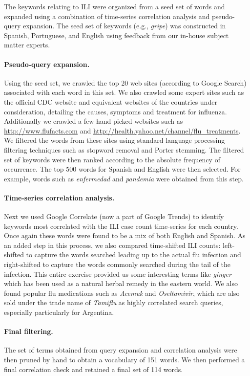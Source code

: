 
The keywords relating to ILI were
organized from a seed set of words and expanded using a combination of 
time-series correlation analysis and pseudo-query expansion.
The seed set of keywords (e.g., {\em gripe}) was constructed in Spanish, 
Portuguese, and English using feedback from our 
in-house subject matter experts.

\paragraph{Pseudo-query expansion.}
Using the seed set, we crawled
the top 20 web sites (according to Google Search) associated with each
word in this set. We also crawled some expert sites such as the official CDC
website and equivalent websites of the countries under consideration, detailing the
causes, symptoms and treatment for influenza.
Additionally we crawled a few hand-picked websites such as
\url{http://www.flufacts.com} and \url{http://health.yahoo.net/channel/flu\_treatments}.
We filtered the words from these sites using standard language
processing filtering techniques such as stopword removal and Porter
stemming. The filtered set of keywords were then ranked according to 
the absolute frequency of occurrence. The top 500 words for Spanish and
English were then selected. For example, words such as {\em enfermedad}
and {\em pandemia} were obtained from this step.

\paragraph{Time-series correlation analysis.}
Next we used Google Correlate (now a part of Google Trends) to identify keywords
most correlated with
the ILI case count time-series for each country.
Once again these words were found to be a mix of 
 both English and Spanish. As an added step in this process, we also
 compared time-shifted ILI counts: left-shifted  to capture the words searched leading up to 
 the actual flu infection and right-shifted to capture the words
commonly searched during the tail of the infection. 
This entire exercise provided us some interesting terms like {\em ginger} which has been used as
a natural herbal remedy in the eastern world. We also found popular flu medications
such as {\em Acemuk} and  {\em Oseltamivir}, which are also sold under the trade name of
{\em Tamiflu} as highly correlated search queries, especially particularly for
Argentina.

\paragraph{Final filtering.}
The set of terms obtained from query expansion and correlation analysis were then 
pruned by hand to obtain a vocabulary of 151 words. We then performed a final
correlation check and retained a final set of 114 words.


